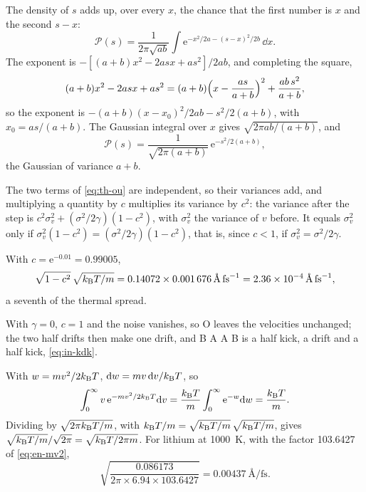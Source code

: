 The density of $s$ adds up, over every $x$,
the chance that the first number is $x$ and the second $s - x$:
\begin{equation*}
   \mathcal{P}(s) = \frac{1}{2\pi\sqrt{ab}}\int\mathrm{e}^{-x^2/2a
   - (s - x)^2/2b}\,\dd x .
\end{equation*}
The exponent is $-[(a + b)x^2 - 2asx + as^2]/2ab$, and completing the
square,
\begin{equation*}
   (a + b)x^2 - 2asx + as^2 = (a + b)\Bigl(x - \frac{as}{a + b}\Bigr)^2
   + \frac{ab\,s^2}{a + b} ,
\end{equation*}
so the exponent is $-(a + b)(x - x_0)^2/2ab - s^2/2(a + b)$, with $x_0 =
as/(a + b)$. The Gaussian integral over $x$ gives $\sqrt{2\pi ab/(a +
b)}$, and
\begin{equation*}
   \mathcal{P}(s) = \frac{1}{\sqrt{2\pi(a + b)}}\,\mathrm{e}^{-s^2/2(a + b)} ,
\end{equation*}
the Gaussian of variance $a + b$.

The two terms of \cref{eq:th-ou} are
independent, so their variances add, and multiplying a quantity by $c$
multiplies its variance by $c^2$: the variance after the step is
$c^2\sigma_v^2 + (\sigma^2/2\gamma)(1 - c^2)$, with $\sigma_v^2$ the
variance of $v$ before. It equals $\sigma_v^2$ only if $\sigma_v^2(1 -
c^2) = (\sigma^2/2\gamma)(1 - c^2)$, that is, since $c < 1$, if
$\sigma_v^2 = \sigma^2/2\gamma$.

With $c = \mathrm{e}^{-0.01} = 0.99005$,
\begin{equation*}
   \sqrt{1 - c^2}\,\sqrt{\kB T/m} = 0.14072\times
   \SI{0.001676}{\angstrom\per\femto\second}
   = \SI{2.36e-4}{\angstrom\per\femto\second} ,
\end{equation*}
a seventh of the thermal spread.

With $\gamma = 0$, $c = 1$ and the noise
vanishes, so O leaves the velocities unchanged; the two half drifts
then make one drift, and B A A B is a half kick, a drift and a half
kick, \cref{eq:in-kdk}.

With $w = mv^2/2k_{\mathrm{B}} T$, $\mathrm{d} w = mv\,\mathrm{d} v/k_{\mathrm{B}} T$,
so
\begin{equation*}
   \int_0^\infty v\,\mathrm{e}^{-mv^2/2k_{\mathrm{B}} T}\mathrm{d} v
   = \frac{k_{\mathrm{B}} T}{m}\int_0^\infty\mathrm{e}^{-w}\mathrm{d} w = \frac{k_{\mathrm{B}} T}{m} .
\end{equation*}
Dividing by $\sqrt{2\pi k_{\mathrm{B}} T/m}$,
with $k_{\mathrm{B}} T/m = \sqrt{k_{\mathrm{B}} T/m}\,\sqrt{k_{\mathrm{B}} T/m}$, gives $\sqrt{k_{\mathrm{B}} T/m}/
\sqrt{2\pi} = \sqrt{k_{\mathrm{B}} T/2\pi m}$. For lithium at \SI{1000}{\kelvin},
with the factor 103.6427 of \cref{eq:en-mv2},
\begin{equation*}
   \sqrt{\frac{0.086173}{2\pi\times6.94\times103.6427}}
   = \SI{0.00437}{\angstrom\per\femto\second} .
\end{equation*}

